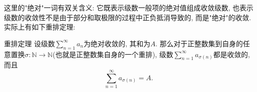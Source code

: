 这里的"绝对"一词有双关含义: 它既表示级数一般项的绝对值组成收敛级数, 也表示级数的收敛性不是由于部分和取极限的过程中正负抵消导致的, 而是"绝对"的收敛. 实际上有如下重排定理:

\begin{theorem}{重排定理}
设级数$\sum_{n=1}^\infty a_n$为绝对收敛的, 其和为$A$. 那么对于正整数集到自身的任意置换$\sigma:\mathbb{N}\to\mathbb{N}$(也就是正整数集自身的一个重排), 级数$\sum_{n=1}^\infty a_{\sigma(n)}$都是收敛的, 而且
$$
\sum_{n=1}^\infty a_{\sigma(n)}=A.
$$
\end{theorem}
